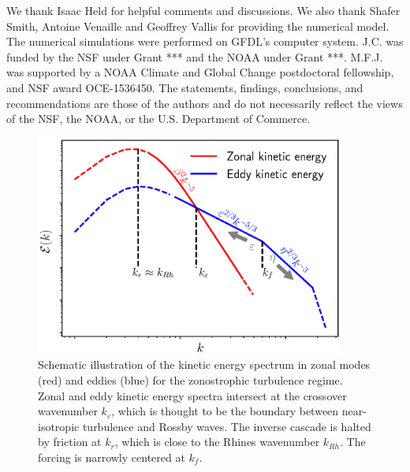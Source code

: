 \documentclass{jfm}
\begin{document}
We thank Isaac Held for helpful comments and discussions. We also thank
Shafer Smith, Antoine Venaille and Geoffrey Vallis for providing the 
numerical model.  The numerical simulations were
performed on GFDL’s computer system. J.C. was
funded by the NSF under Grant *** and the
NOAA under Grant ***.  M.F.J. was supported by a NOAA Climate and Global Change
postdoctoral fellowship, and NSF award OCE-1536450. The statements, findings, conclusions, and recommendations are
those of the authors and do not necessarily reflect the
views of the NSF, the NOAA, or the U.S. Department
of Commerce.




\begin{figure}
\begin{center}
\includegraphics[width=4in]{EKE_ZKE_spectra_illustrate}\caption{Schematic illustration of the kinetic energy spectrum in zonal modes (red) and eddies (blue) for the zonostrophic turbulence regime. Zonal
and eddy kinetic energy spectra intersect at the crossover wavenumber $k_{\varepsilon}$,
which is thought to be the boundary between near-isotropic turbulence and Rossby
waves. The inverse cascade is halted by friction at $k_{r}$, which is
close to the Rhines wavenumber $k_{Rh}$. The forcing is narrowly
centered at $k_{f}$.}
\label{EKE_KE_spectra_illustrate}
\end{center}
\end{figure}
\end{document}
